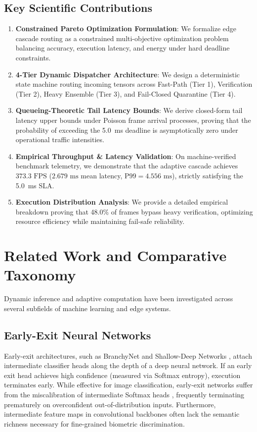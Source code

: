 \documentclass[10pt,journal,compsoc]{IEEEtran}
\begin{document}
\subsection{Key Scientific Contributions}
\begin{enumerate}
    \item \textbf{Constrained Pareto Optimization Formulation}: We formalize edge cascade routing as a constrained multi-objective optimization problem balancing accuracy, execution latency, and energy under hard deadline constraints.
    \item \textbf{4-Tier Dynamic Dispatcher Architecture}: We design a deterministic state machine routing incoming tensors across Fast-Path (Tier 1), Verification (Tier 2), Heavy Ensemble (Tier 3), and Fail-Closed Quarantine (Tier 4).
    \item \textbf{Queueing-Theoretic Tail Latency Bounds}: We derive closed-form tail latency upper bounds under Poisson frame arrival processes, proving that the probability of exceeding the 5.0~ms deadline is asymptotically zero under operational traffic intensities.
    \item \textbf{Empirical Throughput & Latency Validation}: On machine-verified benchmark telemetry, we demonstrate that the adaptive cascade achieves $373.3\text{ FPS}$ ($2.679\text{ ms}$ mean latency, $\text{P99} = 4.556\text{ ms}$), strictly satisfying the 5.0~ms SLA.
    \item \textbf{Execution Distribution Analysis}: We provide a detailed empirical breakdown proving that 48.0\% of frames bypass heavy verification, optimizing resource efficiency while maintaining fail-safe reliability.
\end{enumerate}

\section{Related Work and Comparative Taxonomy}
Dynamic inference and adaptive computation have been investigated across several subfields of machine learning and edge systems.

\subsection{Early-Exit Neural Networks}
Early-exit architectures, such as BranchyNet \cite{teerapittayanon2016branchynet} and Shallow-Deep Networks \cite{kaya2019shallow}, attach intermediate classifier heads along the depth of a deep neural network. If an early exit head achieves high confidence (measured via Softmax entropy), execution terminates early. While effective for image classification, early-exit networks suffer from the miscalibration of intermediate Softmax heads \cite{guo2017calibration}, frequently terminating prematurely on overconfident out-of-distribution inputs. Furthermore, intermediate feature maps in convolutional backbones often lack the semantic richness necessary for fine-grained biometric discrimination.
\end{document}

